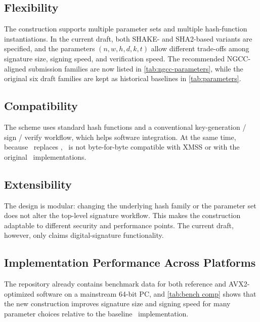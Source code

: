 \subsection{Flexibility}

The construction supports multiple parameter sets and multiple hash-function instantiations. In the current draft, both SHAKE- and SHA2-based variants are specified, and the parameters $(n,w,h,d,k,t)$ allow different trade-offs among signature size, signing speed, and verification speed. The recommended NGCC-aligned submission families are now listed in \cref{tab:ngcc-parameters}, while the original six draft families are kept as historical baselines in \cref{tab:parameters}.

\subsection{Compatibility}

The scheme uses standard hash functions and a conventional key-generation / sign / verify workflow, which helps software integration. At the same time, because \WOTSCS\ replaces \WOTSP, \SPHINCSA\ is not byte-for-byte compatible with XMSS or with the original \SPHINCSP\ implementations.

\subsection{Extensibility}

The design is modular: changing the underlying hash family or the parameter set does not alter the top-level signature workflow. This makes the construction adaptable to different security and performance points. The current draft, however, only claims digital-signature functionality. 

\subsection{Implementation Performance Across Platforms}

The repository already contains benchmark data for both reference and AVX2-optimized software on a mainstream 64-bit PC, and \cref{tab:bench comp} shows that the new construction improves signature size and signing speed for many parameter choices relative to the baseline \SPHINCSP\ implementation. 

